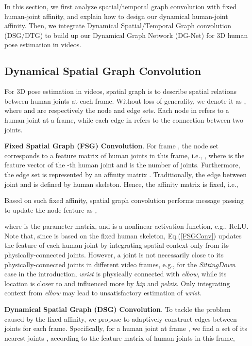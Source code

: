 \documentclass[journal]{IEEEtran}
\begin{document}
In this section,
we first analyze spatial/temporal graph convolution with fixed human-joint affinity,
and explain how to design our dynamical human-joint affinity.
Then,
we integrate Dynamical Spatial/Temporal Graph convolution (DSG/DTG) to build up our Dynamical Graph Network (DG-Net) for 3D human pose estimation in videos.


\subsection{Dynamical Spatial Graph Convolution}
\label{Dynamical Spatial Graph Convolution}

For 3D pose estimation in videos,
spatial graph is to describe spatial relations between human joints at each frame.
Without loss of generality,
we denote it as ,
where
 and  are respectively the node and edge sets.
Each node in  refers to a human joint at a frame,
while
each edge in  refers to the connection between two joints.


\textbf{Fixed Spatial Graph (FSG) Convolution}.
For frame ,
the node set  corresponds to a feature matrix of human joints in this frame,
i.e.,
,
where
 is the feature vector of the -th human joint and  is the number of joints.
Furthermore,
the edge set  is represented by an affinity matrix .
Traditionally,
the edge between joint  and  is defined by human skeleton.
Hence,
the affinity matrix  is fixed, i.e.,

Based on such fixed affinity,
spatial graph convolution performs message passing to update the node feature  as ,

where
 is the parameter matrix,
and
 is a nonlinear activation function,
e.g.,
ReLU.
Note that,
since  is based on the fixed human skeleton,
Eq.(\ref{FSGConv}) updates the feature of each human joint by integrating spatial context only from its physically-connected joints.
However,
a joint is not necessarily close to its physically-connected joints in different video frames,
e.g.,
for the \textit{SittingDown} case in the introduction,
\textit{wrist} is physically connected with \textit{elbow},
while its location is closer to and influenced more by \textit{hip} and \textit{pelvis}.
Only integrating context from \textit{elbow} may lead to unsatisfactory estimation of \textit{wrist}.

\textbf{Dynamical Spatial Graph (DSG) Convolution}.
To tackle the problem caused by the fixed affinity,
we propose to adaptively construct edges between joints for each frame.
Specifically,
for a human joint  at frame ,
we find a set of its  nearest joints ,
according to the feature matrix of human joints  in this frame,
\end{document}
